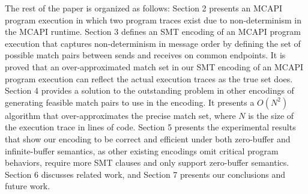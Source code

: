 The rest of the paper is organized as follows:
Section 2 presents an MCAPI program execution in which two program traces exist due to non-determinism in the MCAPI runtime. Section 3 defines an SMT encoding of an MCAPI program execution that captures non-determinism in message order by defining the set of possible match pairs between sends and receives on common endpoints. It is proved that an over-approximated match set in our SMT encoding of an MCAPI program execution can reflect the actual execution traces as the true set does. Section 4 provides a solution to the outstanding problem in other encodings of generating feasible match pairs to use in the encoding. It presents a $O(N^2)$ algorithm that over-approximates the precise match set, where $N$ is the size of the execution trace in lines of code. Section 5 presents the experimental results that show our encoding to be correct and efficient under both zero-buffer and infinite-buffer semantics, as other existing encodings omit critical program behaviors, require more SMT clauses and only support zero-buffer semantics. Section 6 discusses related
work, and Section 7 presents our conclusions and future work.


